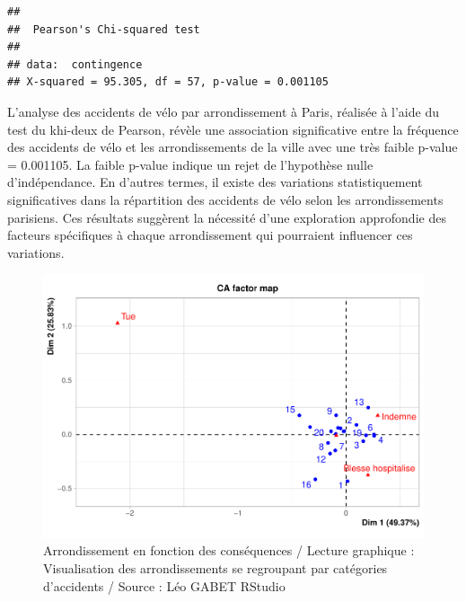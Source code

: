 \documentclass[french,]{compterendu}
\theoremstyle{urcastyle}
\theoremstyle{remark}
\begin{document}
\begin{verbatim}
## 
##  Pearson's Chi-squared test
## 
## data:  contingence
## X-squared = 95.305, df = 57, p-value = 0.001105
\end{verbatim}

L'analyse des accidents de vélo par arrondissement à Paris, réalisée à l'aide du test du khi-deux de Pearson, révèle une association significative entre la fréquence des accidents de vélo et les arrondissements de la ville avec une très faible p-value = 0.001105. La faible p-value indique un rejet de l'hypothèse nulle d'indépendance. En d'autres termes, il existe des variations statistiquement significatives dans la répartition des accidents de vélo selon les arrondissements parisiens. Ces résultats suggèrent la nécessité d'une exploration approfondie des facteurs spécifiques à chaque arrondissement qui pourraient influencer ces variations.

\begin{figure}[H]

{\centering \includegraphics[width=0.9\linewidth]{Rapport_ADD_LEO-GABET_files/figure-latex/Afc2PARIS-1} 

}

\caption{Arrondissement en fonction des conséquences / Lecture graphique : Visualisation des arrondissements se regroupant par catégories d'accidents / Source : Léo GABET RStudio}\label{fig:Afc2PARIS}
\end{figure}
\end{document}
